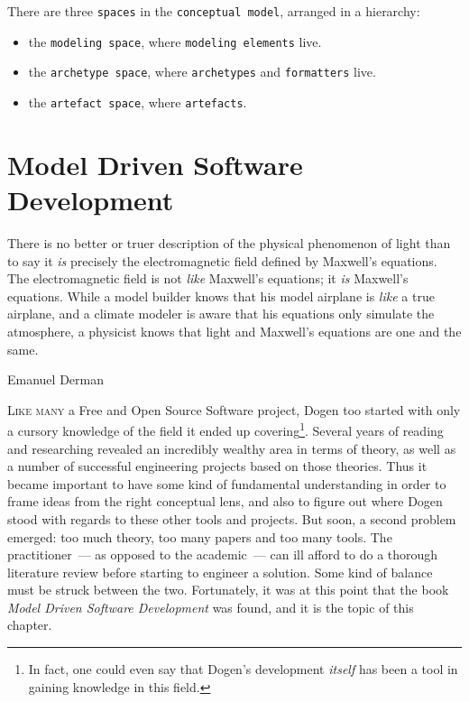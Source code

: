 \documentclass{book}
\begin{document}
There are three \texttt{spaces} in the \texttt{conceptual model},
arranged in a hierarchy:

\begin{itemize}
  \item the \texttt{modeling space}, where \texttt{modeling elements}
    live.
  \item the \texttt{archetype space}, where \texttt{archetypes} and
    \texttt{formatters} live.
  \item the \texttt{artefact space}, where \texttt{artefacts}.
\end{itemize}

\chapter{Model Driven Software Development}
\label{mdsd}

\epigraph{There is no better or truer description of the physical
  phenomenon of light than to say it \emph{is} precisely the
  electromagnetic field defined by Maxwell's equations. The
  electromagnetic field is not \emph{like} Maxwell's equations; it
  \emph{is} Maxwell's equations. While a model builder knows that his
  model airplane is \emph{like} a true airplane, and a climate modeler
  is aware that his equations only simulate the atmosphere, a
  physicist knows that light and Maxwell's equations are one and the
  same.}{Emanuel Derman}

\lettrine{L}{ike many} a Free and Open Source Software project, Dogen
too started with only a cursory knowledge of the field it ended up
covering\footnote{In fact, one could even say that Dogen's development
  \emph{itself} has been a tool in gaining knowledge in this
  field.}. Several years of reading and researching revealed an
incredibly wealthy area in terms of theory, as well as a number of
successful engineering projects based on those theories. Thus it
became important to have some kind of fundamental understanding in
order to frame ideas from the right conceptual lens, and also to
figure out where Dogen stood with regards to these other tools and
projects. But soon, a second problem emerged: too much theory, too
many papers and too many tools. The practitioner~--- as opposed to the
academic~--- can ill afford to do a thorough literature review before
starting to engineer a solution. Some kind of balance must be struck
between the two. Fortunately, it was at this point that the book
\emph{Model Driven Software Development}\cite{2004model} was found,
and it is the topic of this chapter.
\end{document}
